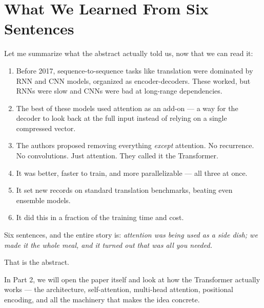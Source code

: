 \section{What We Learned From Six Sentences}

Let me summarize what the abstract actually told us, now that we can read it:

\begin{enumerate}
    \item Before 2017, sequence-to-sequence tasks like translation were dominated by RNN and CNN models, organized as encoder-decoders. These worked, but RNNs were slow and CNNs were bad at long-range dependencies.
    \item The best of these models used attention as an add-on --- a way for the decoder to look back at the full input instead of relying on a single compressed vector.
    \item The authors proposed removing everything \emph{except} attention. No recurrence. No convolutions. Just attention. They called it the Transformer.
    \item It was better, faster to train, and more parallelizable --- all three at once.
    \item It set new records on standard translation benchmarks, beating even ensemble models.
    \item It did this in a fraction of the training time and cost.
\end{enumerate}

Six sentences, and the entire story is: \emph{attention was being used as a side dish; we made it the whole meal, and it turned out that was all you needed.}

That is the abstract.

In Part 2, we will open the paper itself and look at how the Transformer actually works --- the architecture, self-attention, multi-head attention, positional encoding, and all the machinery that makes the idea concrete.
